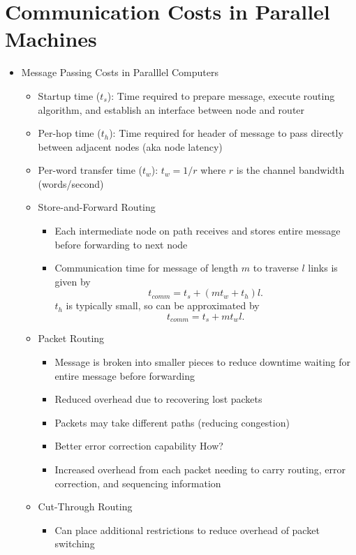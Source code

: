 \documentclass[a4paper]{article}
\begin{document}
\section{Communication Costs in Parallel Machines}
\begin{itemize}
  \item Message Passing Costs in Paralllel Computers
    \begin{itemize}
      \item Startup time ($t_s$): Time required to prepare message, execute routing algorithm, and establish an interface between node and router
      \item Per-hop time ($t_h$): Time required for header of message to pass directly between adjacent nodes (aka node latency)
      \item Per-word transfer time ($t_w$): $t_w = 1/r$ where $r$ is the channel bandwidth (words/second)
      \item Store-and-Forward Routing
        \begin{itemize}
          \item Each intermediate node on path receives and stores entire message before forwarding to next node
          \item Communication time for message of length $m$ to traverse $l$ links is given by
            \[ t_{comm} = t_s + (m t_w + t_h)l .\]
            $t_h$ is typically small, so can be approximated by
            \[ t_{comm} = t_s + m t_w l .\]
        \end{itemize}
      \item Packet Routing
        \begin{itemize}
          \item Message is broken into smaller pieces to reduce downtime waiting for entire message before forwarding
          \item Reduced overhead due to recovering lost packets
          \item Packets may take different paths (reducing congestion)
          \item Better error correction capability {\color{red} How?}
          \item Increased overhead from each packet needing to carry routing, error correction, and sequencing information
        \end{itemize}
      \item Cut-Through Routing
        \begin{itemize}
          \item Can place additional restrictions to reduce overhead of packet switching

\end{itemize}
\end{itemize}
\end{itemize}
\end{document}
